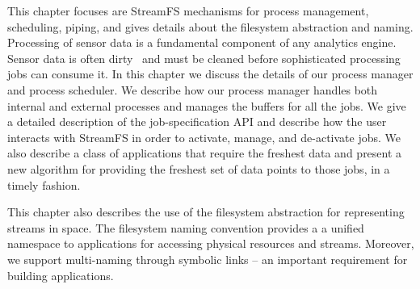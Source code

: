 


This chapter focuses are StreamFS mechanisms for process management, scheduling, piping, and gives details about
the filesystem abstraction and naming.
Processing of sensor data is a fundamental component of any analytics engine.  Sensor data is often dirty~\cite{4160603} and
must be cleaned before sophisticated processing jobs can consume it.  
In this chapter we discuss the details of our process manager and process scheduler.  We describe how our process manager handles
both internal and external processes and manages the buffers for all the jobs.  We give a detailed description of the job-specification
API and describe how the user interacts with StreamFS in order to activate, manage, and de-activate jobs.  We also 
describe a class of applications that require the freshest data and present a new algorithm for providing the freshest set of data
points to those jobs, in a timely fashion.

This chapter also describes the use of the filesystem abstraction for representing streams in space.  The filesystem naming convention
provides a a unified namespace to applications for accessing physical resources and streams.  Moreover, we support multi-naming through
symbolic links -- an important requirement for building applications. 


% 





% 

